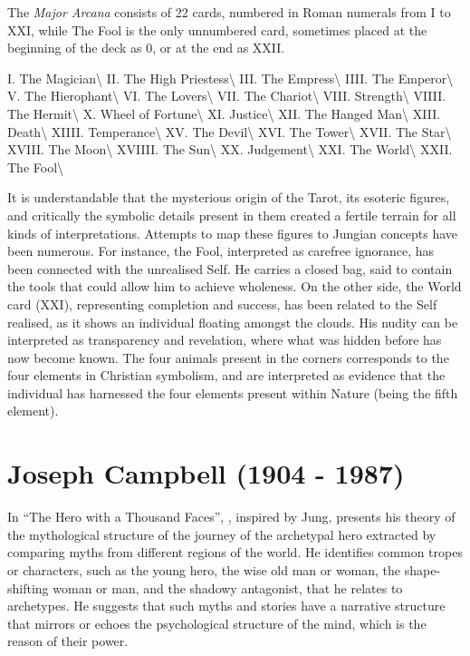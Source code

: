 \documentclass[
]{book}
\begin{document}
The \emph{Major Arcana} consists of 22 cards, numbered in Roman numerals from I to XXI, while The Fool is the only unnumbered card, sometimes placed at the beginning of the deck as 0, or at the end as XXII.

I. The Magician\textbackslash{}
II. The High Priestess\textbackslash{}
III. The Empress\textbackslash{}
IIII. The Emperor\textbackslash{}
V. The Hierophant\textbackslash{}
VI. The Lovers\textbackslash{}
VII. The Chariot\textbackslash{}
VIII. Strength\textbackslash{}
VIIII. The Hermit\textbackslash{}
X. Wheel of Fortune\textbackslash{}
XI. Justice\textbackslash{}
XII. The Hanged Man\textbackslash{}
XIII. Death\textbackslash{}
XIIII. Temperance\textbackslash{}
XV. The Devil\textbackslash{}
XVI. The Tower\textbackslash{}
XVII. The Star\textbackslash{}
XVIII. The Moon\textbackslash{}
XVIIII. The Sun\textbackslash{}
XX. Judgement\textbackslash{}
XXI. The World\textbackslash{}
XXII. The Fool\textbackslash{}

It is understandable that the mysterious origin of the Tarot, its esoteric figures, and critically the symbolic details present in them created a fertile terrain for all kinds of interpretations. Attempts to map these figures to Jungian concepts have been numerous. For instance, the Fool, interpreted as carefree ignorance, has been connected with the unrealised Self. He carries a closed bag, said to contain the tools that could allow him to achieve wholeness. On the other side, the World card (XXI), representing completion and success, has been related to the Self realised, as it shows an individual floating amongst the clouds. His nudity can be interpreted as transparency and revelation, where what was hidden before has now become known. The four animals present in the corners corresponds to the four elements in Christian symbolism, and are interpreted as evidence that the individual has harnessed the four elements present within Nature (being the fifth element).

\hypertarget{joseph-campbell-1904---1987}{%
\section{Joseph Campbell (1904 - 1987)}\label{joseph-campbell-1904---1987}}

In ``The Hero with a Thousand Faces'', \citet{campbell1949hero}, inspired by Jung, presents his theory of the mythological structure of the journey of the archetypal hero extracted by comparing myths from different regions of the world. He identifies common tropes or characters, such as the young hero, the wise old man or woman, the shape-shifting woman or man, and the shadowy antagonist, that he relates to archetypes. He suggests that such myths and stories have a narrative structure that mirrors or echoes the psychological structure of the mind, which is the reason of their power.
\end{document}
